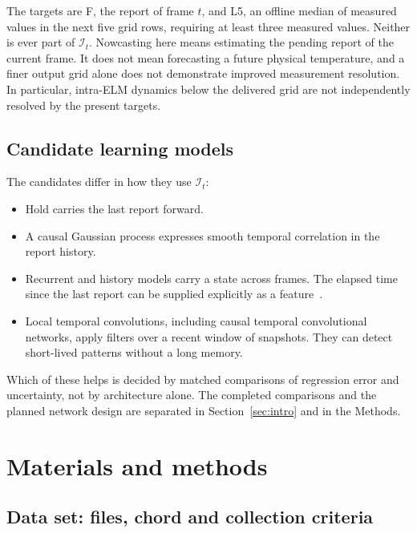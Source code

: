 \documentclass[11pt,a4paper]{article}
\begin{document}
The targets are F, the report of frame $t$, and L5, an offline median of measured values in the next five grid rows, requiring at least three measured values. Neither is ever part of $\mathcal{I}_t$. Nowcasting here means estimating the pending report of the current frame. It does not mean forecasting a future physical temperature, and a finer output grid alone does not demonstrate improved measurement resolution. In particular, intra-ELM dynamics below the delivered grid are not independently resolved by the present targets.

\subsection{Candidate learning models}
The candidates differ in how they use $\mathcal{I}_t$:
\begin{itemize}\setlength{\itemsep}{1pt}
\item Hold carries the last report forward.
\item A causal Gaussian process expresses smooth temporal correlation in the report history.
\item Recurrent and history models carry a state across frames. The elapsed time since the last report can be supplied explicitly as a feature~\citep{Che2018RecurrentNeural}.
\item Local temporal convolutions, including causal temporal convolutional networks, apply filters over a recent window of snapshots. They can detect short-lived patterns without a long memory.
\end{itemize}
Which of these helps is decided by matched comparisons of regression error and uncertainty, not by architecture alone. The completed comparisons and the planned network design are separated in Section~\ref{sec:intro} and in the Methods.


\section{Materials and methods}
\label{sec:data}

\subsection{Data set: files, chord and collection criteria}
\label{sec:data:files}
\end{document}

